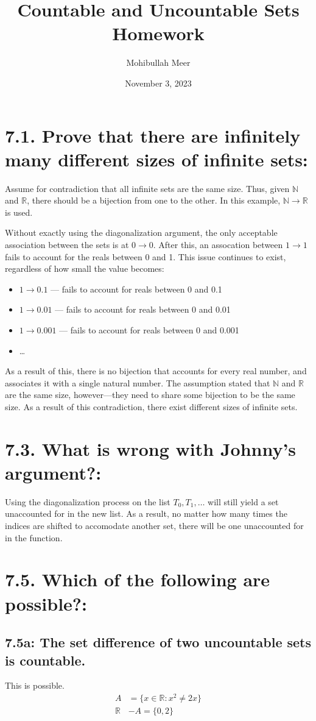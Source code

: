 \documentclass{article}
\title{Countable and Uncountable Sets Homework}
\author{Mohibullah Meer}
\date{November 3, 2023}
\begin{document}
\maketitle
\section*{7.1. Prove that there are infinitely many different sizes of infinite sets:}
Assume for contradiction that all infinite sets are the same size. Thus, given $\mathbb{N}$ and $\mathbb{R}$, there should be a bijection from one to the other. In this example, $\mathbb{N}\rightarrow \mathbb{R}$ is used.

Without exactly using the diagonalization argument, the only acceptable association between the sets is at $0\rightarrow 0$. After this, an assocation between $1\rightarrow 1$ fails to account for the reals between 0 and 1. This issue continues to exist, regardless of how small the value becomes:
\begin{itemize}
  \item $1\rightarrow 0.1$ --- fails to account for reals between 0 and 0.1
  \item $1\rightarrow 0.01$ --- fails to account for reals between 0 and 0.01
  \item $1\rightarrow 0.001$ --- fails to account for reals between 0 and 0.001
  \item \ldots
\end{itemize}
As a result of this, there is no bijection that accounts for every real number, and associates it with a single natural number. The assumption stated that $\mathbb{N}$ and $\mathbb{R}$ are the same size, however---they need to share some bijection to be the same size. As a result of this contradiction, there exist different sizes of infinite sets.
\section*{7.3. What is wrong with Johnny's argument?:}
Using the diagonalization process on the list $T_0,T_1,\ldots$ will still yield a set unaccounted for in the new list. As a result, no matter how many times the indices are shifted to accomodate another set, there will be one unaccounted for in the function. 
\section*{7.5. Which of the following are possible?:}
\subsection*{7.5a: The set difference of two uncountable sets is countable.}
This is possible.
\begin{align*}
  A&=\{x\in\mathbb{R}:x^2\neq2x\}\\
  \mathbb{R}&-A=\{0,2\}
\end{align*}
\end{document}
